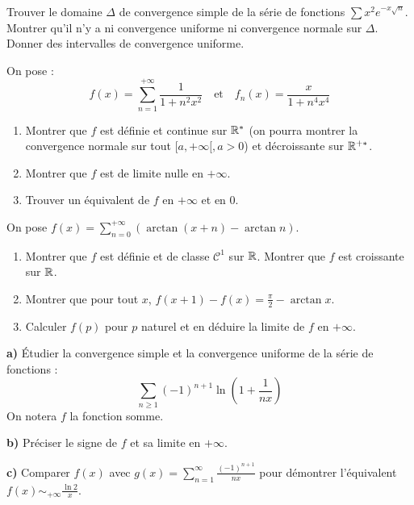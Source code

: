 \documentclass{prepacours}
\begin{document}
\begin{exercice}
Trouver le domaine $\Delta$ de convergence simple de la série de fonctions $\sum x^2 e^{-x\sqrt{n}}$.
Montrer qu'il n'y a ni convergence uniforme ni convergence normale sur $\Delta$.
Donner des intervalles de convergence uniforme.
\end{exercice}

\begin{exercice}
On pose :
$$ f(x) = \sum_{n=1}^{+\infty} \frac{1}{1+n^2 x^2} \quad \text{et} \quad f_n(x) = \frac{x}{1+n^4 x^4} $$
\begin{enumerate}
    \item Montrer que $f$ est définie et continue sur $\mathbb{R}^*$ (on pourra montrer la convergence normale sur tout $[a, +\infty[, a>0$) et décroissante sur $\mathbb{R}^{+*}$.
    \item Montrer que $f$ est de limite nulle en $+\infty$.
    \item Trouver un équivalent de $f$ en $+\infty$ et en $0$.
\end{enumerate}
\end{exercice}

\begin{exercice}
On pose $f(x) = \sum_{n=0}^{+\infty} (\arctan(x+n) - \arctan n)$.
\begin{enumerate}
    \item Montrer que $f$ est définie et de classe $\mathcal{C}^1$ sur $\mathbb{R}$. Montrer que $f$ est croissante sur $\mathbb{R}$.
    \item Montrer que pour tout $x$, $f(x+1) - f(x) = \frac{\pi}{2} - \arctan x$.
    \item Calculer $f(p)$ pour $p$ naturel et en déduire la limite de $f$ en $+\infty$.
\end{enumerate}
\end{exercice}

\begin{exercice}
\textbf{a)} Étudier la convergence simple et la convergence uniforme de la série de fonctions :
$$ \sum_{n\ge 1} (-1)^{n+1} \ln\left(1+\frac{1}{nx}\right) $$
On notera $f$ la fonction somme.

\textbf{b)} Préciser le signe de $f$ et sa limite en $+\infty$.

\textbf{c)} Comparer $f(x)$ avec $g(x) = \sum_{n=1}^\infty \frac{(-1)^{n+1}}{nx}$ pour démontrer l'équivalent $f(x) \sim_{+\infty} \frac{\ln 2}{x}$.
\end{exercice}
\end{document}
